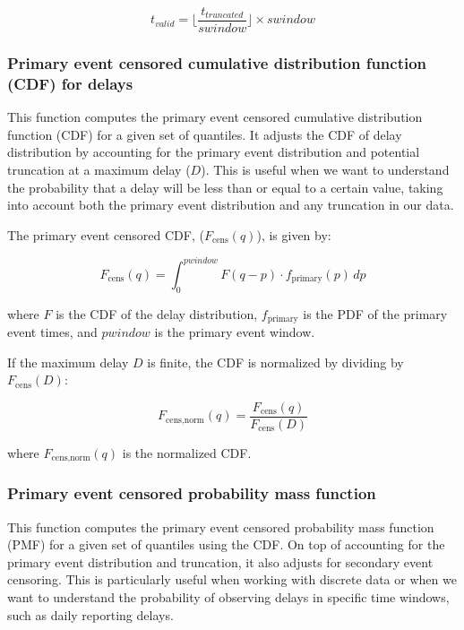 \documentclass[10pt,letterpaper]{article}
\begin{document}
\begin{equation}t_{valid} = \lfloor \frac{t_{truncated}}{swindow} \rfloor \times swindow\end{equation}

\subsubsection{Primary event censored cumulative distribution function (CDF) for delays}

This function computes the primary event censored cumulative distribution function (CDF) for a given set of quantiles. It adjusts the CDF of delay distribution by accounting for the primary event distribution and potential truncation at a maximum delay ($D$). This is useful when we want to understand the probability that a delay will be less than or equal to a certain value, taking into account both the primary event distribution and any truncation in our data.

The primary event censored CDF, ($F_{\text{cens}}(q)$), is given by:

\begin{equation}
F_{\text{cens}}(q) = \int_{0}^{pwindow} F(q - p) \cdot f_{\text{primary}}(p) \, dp
\end{equation}

where $F$ is the CDF of the delay distribution, $f_{\text{primary}}$ is the PDF of the primary event times, and $pwindow$ is the primary event window.

If the maximum delay $D$ is finite, the CDF is normalized by dividing by $F_{\text{cens}}(D)$:

\begin{equation}
F_{\text{cens,norm}}(q) = \frac{F_{\text{cens}}(q)}{F_{\text{cens}}(D)}
\end{equation}

where $F_{\text{cens,norm}}(q)$ is the normalized CDF.

\subsubsection{Primary event censored probability mass function}
This function computes the primary event censored probability mass function (PMF) for a given set of quantiles using the CDF. On top of accounting for the primary event distribution and truncation, it also adjusts for secondary event censoring. This is particularly useful when working with discrete data or when we want to understand the probability of observing delays in specific time windows, such as daily reporting delays.
\end{document}
